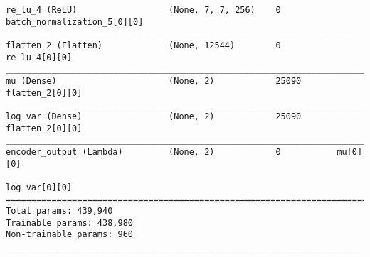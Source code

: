 \begin{lstlisting}[caption={\textsc{Mnist}-VAE-GAN Encoder},captionpos=b,basicstyle=\tiny, label={lst:mnist-vae-encoder}]
re_lu_4 (ReLU)                  (None, 7, 7, 256)    0           batch_normalization_5[0][0]
__________________________________________________________________________________________________
flatten_2 (Flatten)             (None, 12544)        0           re_lu_4[0][0]
__________________________________________________________________________________________________
mu (Dense)                      (None, 2)            25090       flatten_2[0][0]
__________________________________________________________________________________________________
log_var (Dense)                 (None, 2)            25090       flatten_2[0][0]
__________________________________________________________________________________________________
encoder_output (Lambda)         (None, 2)            0           mu[0][0]
                                                                 log_var[0][0]
==================================================================================================
Total params: 439,940
Trainable params: 438,980
Non-trainable params: 960
__________________________________________________________________________________________________
\end{lstlisting}